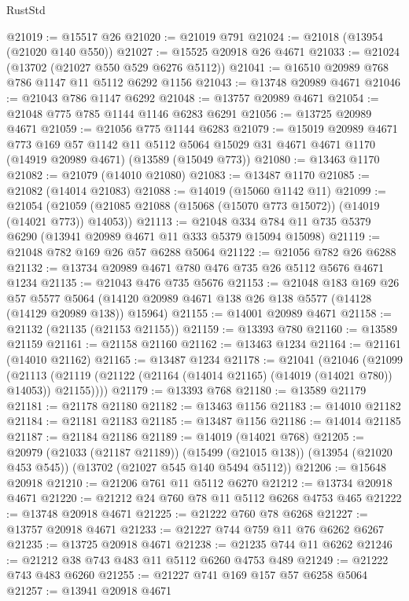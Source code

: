 \begin{lexlean}{RustStd}
\begin{coremodule}
@21019 := @15517 @26
@21020 := @21019 @791
@21024 := @21018 (@13954 (@21020 @140 @550))
@21027 := @15525 @20918 @26 @4671
@21033 := @21024 (@13702 (@21027 @550 @529 @6276 @5112))
@21041 := @16510 @20989 @768 @786 @1147 @11 @5112 @6292 @1156
@21043 := @13748 @20989 @4671
@21046 := @21043 @786 @1147 @6292
@21048 := @13757 @20989 @4671
@21054 := @21048 @775 @785 @1144 @1146 @6283 @6291
@21056 := @13725 @20989 @4671
@21059 := @21056 @775 @1144 @6283
@21079 := @15019
    @20989
    @4671
    @773
    @169
    @57
    @1142
    @11
    @5112
    @5064
    @15029
    @31
    @4671
    @4671
    @1170
    (@14919 @20989 @4671)
    (@13589 (@15049 @773))
@21080 := @13463 @1170
@21082 := @21079 (@14010 @21080)
@21083 := @13487 @1170
@21085 := @21082 (@14014 @21083)
@21088 := @14019 (@15060 @1142 @11)
@21099 := @21054
    (@21059 (@21085 @21088 (@15068 (@15070 @773 @15072)) (@14019 (@14021 @773)) @14053))
@21113 := @21048 @334 @784 @11 @735 @5379 @6290 (@13941 @20989 @4671 @11 @333 @5379 @15094 @15098)
@21119 := @21048 @782 @169 @26 @57 @6288 @5064
@21122 := @21056 @782 @26 @6288
@21132 := @13734 @20989 @4671 @780 @476 @735 @26 @5112 @5676 @4671 @1234
@21135 := @21043 @476 @735 @5676
@21153 := @21048
    @183
    @169
    @26
    @57
    @5577
    @5064
    (@14120 @20989 @4671 @138 @26 @138 @5577 (@14128 (@14129 @20989 @138)) @15964)
@21155 := @14001 @20989 @4671
@21158 := @21132 (@21135 (@21153 @21155))
@21159 := @13393 @780
@21160 := @13589 @21159
@21161 := @21158 @21160
@21162 := @13463 @1234
@21164 := @21161 (@14010 @21162)
@21165 := @13487 @1234
@21178 := @21041
    (@21046
      (@21099
        (@21113 (@21119 (@21122 (@21164 (@14014 @21165) (@14019 (@14021 @780)) @14053)) @21155))))
@21179 := @13393 @768
@21180 := @13589 @21179
@21181 := @21178 @21180
@21182 := @13463 @1156
@21183 := @14010 @21182
@21184 := @21181 @21183
@21185 := @13487 @1156
@21186 := @14014 @21185
@21187 := @21184 @21186
@21189 := @14019 (@14021 @768)
@21205 := @20979
    (@21033 (@21187 @21189))
    (@15499 (@21015 @138))
    (@13954 (@21020 @453 @545))
    (@13702 (@21027 @545 @140 @5494 @5112))
@21206 := @15648 @20918
@21210 := @21206 @761 @11 @5112 @6270
@21212 := @13734 @20918 @4671
@21220 := @21212 @24 @760 @78 @11 @5112 @6268 @4753 @465
@21222 := @13748 @20918 @4671
@21225 := @21222 @760 @78 @6268
@21227 := @13757 @20918 @4671
@21233 := @21227 @744 @759 @11 @76 @6262 @6267
@21235 := @13725 @20918 @4671
@21238 := @21235 @744 @11 @6262
@21246 := @21212 @38 @743 @483 @11 @5112 @6260 @4753 @489
@21249 := @21222 @743 @483 @6260
@21255 := @21227 @741 @169 @157 @57 @6258 @5064
@21257 := @13941 @20918 @4671

\end{coremodule}
\end{lexlean}
